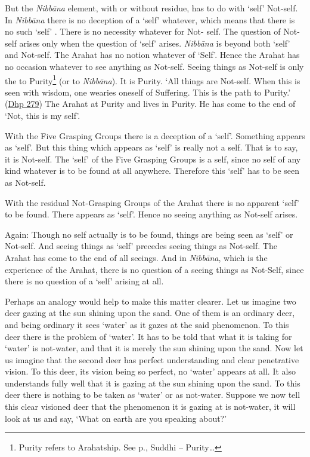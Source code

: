 But the \emph{Nibbāna} element, with or without residue, has  to do with `self'  Not-self. In \emph{Nibbāna} there is no deception of a `self' whatever, which means that there is no such `self' . There is no necessity whatever for Not- self. The question of Not-self arises only when the question of `self' arises. \emph{Nibbāna} is beyond both `self' and Not-self. The Arahat has no notion whatever of `Self'. Hence the Arahat has no occasion whatever to see anything as Not-self. Seeing things as Not-self is only the  to Purity\footnote{Purity refers to Arahatship. See p.\pageref{ch-13-suddhi}, Suddhi -- Purity\ldots{}} (or to \emph{Nibbāna}). It is  Purity. `All things are Not-self. When this is seen with wisdom, one wearies oneself of Suffering. This is the path to Purity.' (\href{https://suttacentral.net/dhp273-289/en/anandajoti}{Dhp 279}) The Arahat  at Purity and lives in Purity. He has come to the end of `Not, this is my self'.

With the Five Grasping Groups there is a deception of a `self'. Something appears as `self'. But this thing which appears as `self' is really not a self. That is to say, it is Not-self. The `self' of the Five Grasping Groups is  a self, since no self of any kind whatever is to be found at all anywhere. Therefore this `self' has to be seen as Not-self.

With the residual Not-Grasping Groups of the Arahat there is no apparent `self' to be found. There  appears as `self'. Hence no seeing anything as Not-self arises.

Again: Though no self actually is to be found, things are being seen as `self' or Not-self. And seeing things as `self' precedes seeing things as Not-self. The Arahat has come to the end of all seeings. And in \emph{Nibbāna}, which is the experience of the Arahat, there is no question of a seeing things as Not-Self, since there is no question of a `self' arising at all.

Perhaps an analogy would help to make this matter clearer. Let us imagine two deer gazing at the sun shining upon the sand. One of them is an ordinary deer, and being ordinary it sees `water' as it gazes at the said phenomenon. To this deer there is the problem of `water'. It has to be told that what it is taking for `water' is not-water, and that it is merely the sun shining upon the sand. Now let us imagine that the second deer has perfect understanding and clear penetrative vision. To this deer, its vision being so perfect, no `water' appears at all. It also understands fully well that it is gazing at the sun shining upon the sand. To this deer there is nothing to be taken as `water' or as not-water. Suppose we now tell this clear visioned deer that the phenomenon it is gazing at is not-water, it will look at us and say, `What on earth are you speaking about?'

